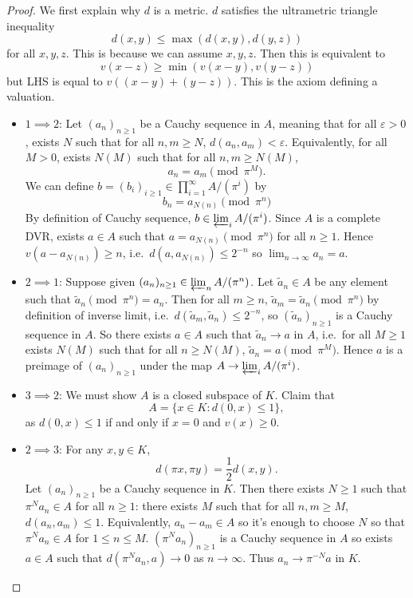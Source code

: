 \documentclass[a4paper]{article}
\begin{document}
\begin{proof}
  We first explain why \(d\) is a metric. \(d\) satisfies the ultrametric triangle inequality
  \[
    d(x, y) \leq \max(d(x, y), d(y, z))
  \]
  for all \(x, y, z\). This is because we can assume \(x, y, z\). Then this is equivalent to
  \[
    v(x - z) \geq \min(v(x - y), v(y - z))
  \]
  but LHS is equal to \(v((x - y) + (y - z))\). This is the axiom defining a valuation.
  \begin{itemize}
  \item \(1 \implies 2\): Let \((a_n)_{n \geq 1}\) be a Cauchy sequence in \(A\), meaning that for all \(\varepsilon > 0\), exists \(N\) such that for all \(n, m \geq N\), \(d(a_n, a_m) < \varepsilon\). Equivalently, for all \(M > 0\), exists \(N(M)\) such that for all \(n, m \geq N(M)\),
    \[
      a_n = a_m \pmod{\pi^M}.
    \]
    We can define \(b = (b_i)_{i \geq 1} \in \prod_{i = 1}^\infty A/(\pi^i)\) by
    \[
      b_n = a_{N(n)} \pmod {\pi^n}
    \]
    By definition of Cauchy sequence, \(b \in \varprojlim_i A/(\pi^i)\). Since \(A\) is a complete DVR, exists \(a \in A\) such that \(a = a_{N(n)} \pmod{\pi^n}\) for all \(n \geq 1\). Hence \(v(a - a_{N(n)}) \geq n\), i.e.\ \(d(a, a_{N(n)}) \leq 2^{-n}\) so \(\lim_{n \to \infty} a_n = a\).
  \item \(2 \implies 1\): Suppose given \((a_n)_{n \geq 1} \in \varprojlim_n A/(\pi^n)\). Let \(\tilde a_n \in A\) be any element such that \(\tilde a_n \pmod{\pi^n} = a_n\). Then for all \(m \geq n\), \(\tilde a_m = \tilde a_n \pmod{\pi^n}\) by definition of inverse limit, i.e.\ \(d(\tilde a_m, \tilde a_n) \leq 2^{-n}\), so \((\tilde a_n)_{n \geq 1}\) is a Cauchy sequence in \(A\). So there exists \(a \in A\) such that \(\tilde a_n \to a\) in \(A\), i.e.\ for all \(M \geq 1\) exists \(N(M)\) such that for all \(n \geq N(M)\), \(\tilde a_n = a \pmod{\pi^M}\). Hence \(a\) is a preimage of \((a_n)_{n \geq 1}\) under the map \(A \to \varprojlim_i A/(\pi^i)\).
  \item \(3 \implies 2\): We must show \(A\) is a closed subspace of \(K\). Claim that
    \[
      A = \{x \in K: d(0, x) \leq 1\},
    \]
    as \(d(0, x) \leq 1\) if and only if \(x = 0\) and \(v(x) \geq 0\).
  \item \(2 \implies 3\): For any \(x, y \in K\),
    \[
      d(\pi x, \pi y) = \frac{1}{2} d(x, y).
    \]
    Let \((a_n)_{n \geq 1}\) be a Cauchy sequence in \(K\). Then there exists \(N \geq 1\) such that \(\pi^N a_n \in A\) for all \(n \geq 1\): there exists \(M\) such that for all \(n, m \geq M\), \(d(a_n, a_m) \leq 1\). Equivalently, \(a_n - a_m \in A\) so it's enough to choose \(N\) so that \(\pi^N a_n \in A\) for \(1 \leq n \leq M\). \((\pi^N a_n)_{n \geq 1}\) is a Cauchy sequence in \(A\) so exists \(a \in A\) such that \(d(\pi^N a_n, a) \to 0\) as \(n \to \infty\). Thus \(a_n \to \pi^{-N} a\) in \(K\).
  \end{itemize}
\end{proof}
\end{document}
